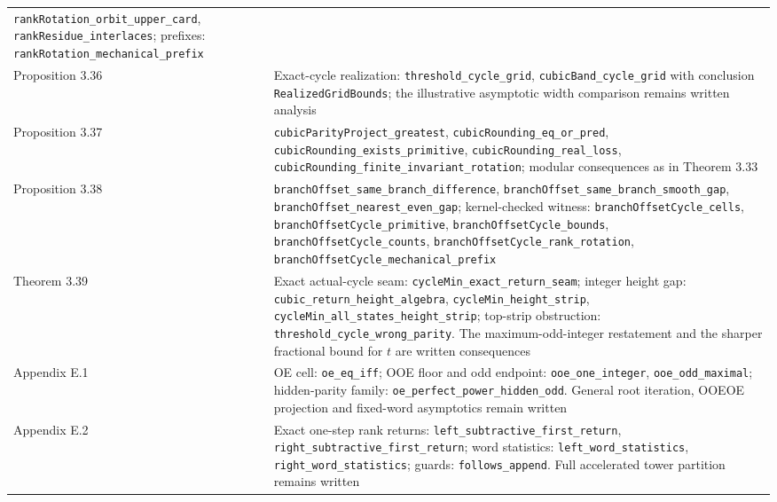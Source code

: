 \documentclass[12pt]{article}
\begin{document}
\begin{longtable}[]{@{}
  >{\raggedright\arraybackslash}p{}
  >{\raggedright\arraybackslash}p{}@{}}
\texttt{\nolinkurl{rankRotation_orbit_upper_card}},
\texttt{\nolinkurl{rankResidue_interlaces}}; prefixes:
\texttt{\nolinkurl{rankRotation_mechanical_prefix}} \\
Proposition 3.36 & Exact-cycle realization:
\texttt{\nolinkurl{threshold_cycle_grid}},
\texttt{\nolinkurl{cubicBand_cycle_grid}} with conclusion
\texttt{\nolinkurl{RealizedGridBounds}}; the illustrative asymptotic
width comparison remains written analysis \\
Proposition 3.37 & \texttt{\nolinkurl{cubicParityProject_greatest}},
\texttt{\nolinkurl{cubicRounding_eq_or_pred}},
\texttt{\nolinkurl{cubicRounding_exists_primitive}},
\texttt{\nolinkurl{cubicRounding_real_loss}},
\texttt{\nolinkurl{cubicRounding_finite_invariant_rotation}}; modular
consequences as in Theorem 3.33 \\
Proposition 3.38 &
\texttt{\nolinkurl{branchOffset_same_branch_difference}},
\texttt{\nolinkurl{branchOffset_same_branch_smooth_gap}},
\texttt{\nolinkurl{branchOffset_nearest_even_gap}}; kernel-checked
witness: \texttt{\nolinkurl{branchOffsetCycle_cells}},
\texttt{\nolinkurl{branchOffsetCycle_primitive}},
\texttt{\nolinkurl{branchOffsetCycle_bounds}},
\texttt{\nolinkurl{branchOffsetCycle_counts}},
\texttt{\nolinkurl{branchOffsetCycle_rank_rotation}},
\texttt{\nolinkurl{branchOffsetCycle_mechanical_prefix}} \\
Theorem 3.39 & Exact actual-cycle seam:
\texttt{\nolinkurl{cycleMin_exact_return_seam}}; integer height gap:
\texttt{\nolinkurl{cubic_return_height_algebra}},
\texttt{\nolinkurl{cycleMin_height_strip}},
\texttt{\nolinkurl{cycleMin_all_states_height_strip}}; top-strip
obstruction: \texttt{\nolinkurl{threshold_cycle_wrong_parity}}. The
maximum-odd-integer restatement and the sharper fractional bound for
\(t\) are written consequences \\
Appendix E.1 & OE cell: \texttt{\nolinkurl{oe_eq_iff}}; OOE floor and
odd endpoint: \texttt{\nolinkurl{ooe_one_integer}},
\texttt{\nolinkurl{ooe_odd_maximal}}; hidden-parity family:
\texttt{\nolinkurl{oe_perfect_power_hidden_odd}}. General root
iteration, OOEOE projection and fixed-word asymptotics remain written \\
Appendix E.2 & Exact one-step rank returns:
\texttt{\nolinkurl{left_subtractive_first_return}},
\texttt{\nolinkurl{right_subtractive_first_return}}; word statistics:
\texttt{\nolinkurl{left_word_statistics}},
\texttt{\nolinkurl{right_word_statistics}}; guards:
\texttt{\nolinkurl{follows_append}}. Full accelerated tower partition
remains written \\

\end{longtable}
\end{document}
